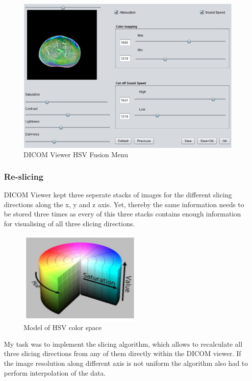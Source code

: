 \documentclass[english]{article}
\begin{document}
\begin{figure}
\centerline{\includegraphics[scale=0.5]{internship_report/final}}
\caption{DICOM Viewer HSV Fusion Menu \label{fig:final}}
\end{figure}

\subsubsection{Re-slicing}

DICOM Viewer kept three seperate stacks of images for the different slicing directions along the x, y and z axis. Yet, thereby the same information needs to be stored three times as every of this three stacks contains enough information for visualising of all three slicing directions.\\
\begin{figure}[H]
\centerline{\includegraphics[scale=0.7]{internship_report/model}}
\caption{Model of HSV color space\label{fig:model}}
\end{figure}
My task was to implement the slicing algorithm, which allows to recalculate all three slicing directions from any of them directly within the DICOM viewer. If the image resolution along different axis is not uniform the algorithm also had to perform interpolation of the data.\\
\end{document}
